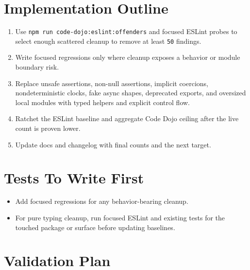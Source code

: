 \section{Implementation Outline}\label{record-240-implementation-outline}

\begin{enumerate}
\def\labelenumi{\arabic{enumi}.}
\tightlist
\item
  Use \texttt{n\allowbreak{}p\allowbreak{}m\allowbreak{} \allowbreak{}r\allowbreak{}u\allowbreak{}n\allowbreak{} \allowbreak{}c\allowbreak{}o\allowbreak{}d\allowbreak{}e\allowbreak{}-\allowbreak{}d\allowbreak{}o\allowbreak{}j\allowbreak{}o\allowbreak{}:\allowbreak{}e\allowbreak{}s\allowbreak{}l\allowbreak{}i\allowbreak{}n\allowbreak{}t\allowbreak{}:\allowbreak{}o\allowbreak{}f\allowbreak{}f\allowbreak{}e\allowbreak{}n\allowbreak{}d\allowbreak{}e\allowbreak{}r\allowbreak{}s} and focused ESLint probes to select enough scattered cleanup to remove at least \texttt{5\allowbreak{}0} findings.
\item
  Write focused regressions only where cleanup exposes a behavior or module boundary risk.
\item
  Replace unsafe assertions, non-null assertions, implicit coercions, nondeterministic clocks, fake async shapes, deprecated exports, and oversized local modules with typed helpers and explicit control flow.
\item
  Ratchet the ESLint baseline and aggregate Code Dojo ceiling after the live count is proven lower.
\item
  Update docs and changelog with final counts and the next target.
\end{enumerate}

\section{Tests To Write First}\label{record-240-tests-to-write-first}

\begin{itemize}
\tightlist
\item
  Add focused regressions for any behavior-bearing cleanup.
\item
  For pure typing cleanup, run focused ESLint and existing tests for the touched package or surface before updating baselines.
\end{itemize}

\section{Validation Plan}\label{record-240-validation-plan}

